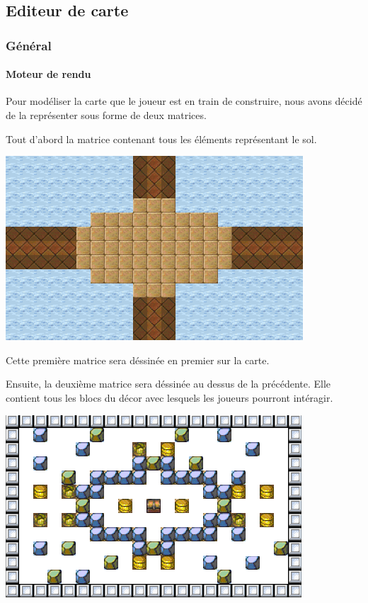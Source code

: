 			

\subsection{Editeur de carte}

	\hypertarget{Editeur de carte}{}
	\label{Editeur de carte}
	
	\subsubsection{Général}
		\paragraph{Moteur de rendu\\}
			Pour modéliser la carte que le joueur est en train de construire, nous avons décidé de la représenter sous forme de deux matrices. 
			
			Tout d'abord la matrice contenant tous les éléments représentant le sol.
			\begin{center}
				\includegraphics{./Developpement/Img/image1.png}
			\end{center}
			Cette première matrice sera déssinée en premier sur la carte.
			
			Ensuite, la deuxième matrice sera déssinée au dessus de la précédente. Elle contient tous les blocs du décor avec lesquels les joueurs pourront intéragir. 
			\begin{center}
				\includegraphics{./Developpement/Img/image2.png}
			\end{center}
			

